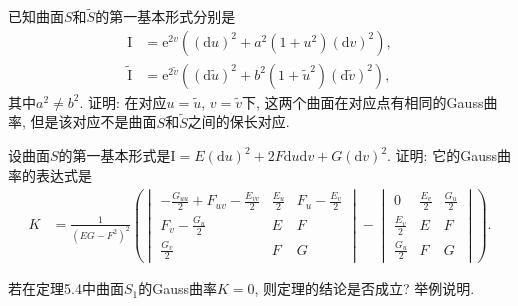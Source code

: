 \documentclass[../../main.tex]{subfiles}%
\begin{document}
\begin{example}
已知曲面$S$和$\tilde{S}$的第一基本形式分别是
\begin{align*}
\mathrm{I} &= \mathrm{e}^{2v}\left((\mathrm{d}u)^2+a^2(1+u^2)(\mathrm{d}v)^2\right),\\
\tilde{\mathrm{I}} &= \mathrm{e}^{2\tilde{v}}\left((\mathrm{d}\tilde{u})^2+b^2(1+\tilde{u}^2)(\mathrm{d}\tilde{v})^2\right),
\end{align*}
其中$a^2\neq b^2$. 证明: 在对应$u=\tilde{u}$, $v=\tilde{v}$下, 这两个曲面在对应点有相同的Gauss曲率, 但是该对应不是曲面$S$和$\tilde{S}$之间的保长对应.
\end{example}

\begin{example}
设曲面$S$的第一基本形式是$\mathrm{I}=E(\mathrm{d}u)^2+2F\mathrm{d}u\mathrm{d}v+G(\mathrm{d}v)^2$. 证明: 它的Gauss曲率的表达式是
\begin{align*}
K &= \frac{1}{(EG-F^2)^2}
\left(
\begin{vmatrix}
-\frac{G_{uu}}{2}+F_{uv}-\frac{E_{vv}}{2} & \frac{E_u}{2} & F_u-\frac{E_v}{2}\\[4pt]
F_v-\frac{G_u}{2} & E & F\\[4pt]
\frac{G_v}{2} & F & G
\end{vmatrix}
-
\begin{vmatrix}
0 & \frac{E_v}{2} & \frac{G_u}{2}\\[4pt]
\frac{E_v}{2} & E & F\\[4pt]
\frac{G_u}{2} & F & G
\end{vmatrix}
\right).
\end{align*}
\end{example}

\begin{example}
若在定理5.4中曲面$S_1$的Gauss曲率$K=0$, 则定理的结论是否成立? 举例说明.
\end{example}
\end{document}
